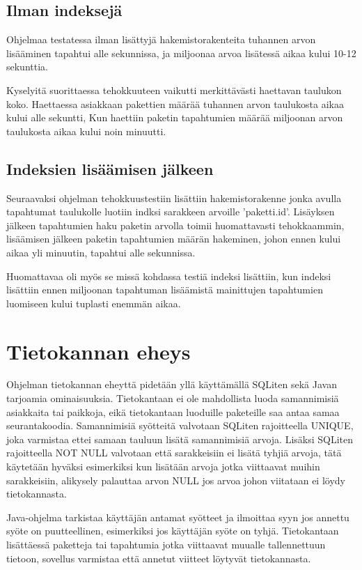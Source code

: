 \documentclass[11pt,a4paper]{article}
\begin{document}
\subsection*{Ilman indeksejä}
Ohjelmaa testatessa ilman lisättyjä hakemistorakenteita tuhannen arvon lisääminen tapahtui alle sekunnissa, ja miljoonaa arvoa lisätessä aikaa kului 10-12 sekunttia. 

Kyselyitä suorittaessa tehokkuuteen vaikutti merkittävästi haettavan taulukon koko. Haettaessa asiakkaan pakettien määrää tuhannen arvon taulukosta aikaa kului alle sekuntti, Kun haettiin paketin tapahtumien määrää miljoonan arvon taulukosta aikaa kului noin minuutti.


\subsection*{Indeksien lisäämisen jälkeen}
Seuraavaksi ohjelman tehokkuustestiin lisättiin hakemistorakenne jonka avulla tapahtumat taulukolle luotiin indksi sarakkeen arvoille 'paketti.id'. Lisäyksen jälkeen tapahtumien haku paketin arvolla toimii huomattavasti tehokkaammin, lisäämisen jälkeen paketin tapahtumien määrän hakeminen, johon ennen kului aikaa yli minuutin, tapahtui alle sekunnissa.

Huomattavaa oli myös se missä kohdassa testiä indeksi lisättiin, kun indeksi lisättiin ennen miljoonan tapahtuman lisäämistä mainittujen tapahtumien luomiseen kului tuplasti enemmän aikaa. 

\newpage
\section{Tietokannan eheys}
Ohjelman tietokannan eheyttä pidetään yllä käyttämällä SQLiten sekä Javan tarjoamia ominaisuuksia.
Tietokantaan ei ole mahdollista luoda samannimisiä asiakkaita tai paikkoja, eikä tietokantaan luoduille paketeille saa antaa samaa seurantakoodia. Samannimisiä syötteitä valvotaan SQLiten rajoitteella UNIQUE, joka varmistaa ettei samaan tauluun lisätä samannimisiä arvoja. Lisäksi SQLiten rajoitteella NOT NULL valvotaan että sarakkeisiin ei lisätä tyhjiä arvoja, tätä käytetään hyväksi esimerkiksi kun lisätään arvoja jotka viittaavat muihin sarakkeisiin, alikysely palauttaa arvon NULL jos arvoa johon viitataan ei löydy tietokannasta.
 
Java-ohjelma tarkistaa käyttäjän antamat syötteet ja ilmoittaa syyn jos annettu syöte on puutteellinen, esimerkiksi jos käyttäjän syöte on tyhjä. Tietokantaan lisättäessä paketteja tai tapahtumia jotka viittaavat muualle tallennettuun tietoon, sovellus varmistaa että annetut viitteet löytyvät tietokannasta.
\end{document}
